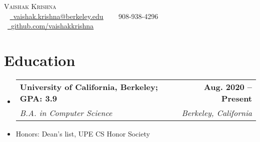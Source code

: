\documentclass[letterpaper,11pt]{article}
\makeatletter
\newcommand{\resumeSubheading}[4]{
  \vspace{-2pt}\item
    \begin{tabular*}{1.0\textwidth}[t]{l@{\extracolsep{\fill}}r}
      \vspace{2pt}
      \textbf{#1} & \textbf{\small #2} \\ 
      \textit{\small#3} & \textit{\small #4} \\
    \end{tabular*}\vspace{-5pt}
}
\newcommand{\resumeSubHeadingListStart}{\begin{itemize}[leftmargin=0.0in, label={}]}
\newcommand{\resumeSubHeadingListEnd}{\end{itemize}}
\makeatother
\begin{document}

\begin{center}
    {\Huge \scshape Vaishak Krishna} \\ \vspace{6pt}
    ~ \small \href{mailto:vaishak.krishna@berkeley.edu}{\raisebox{-0.2\height}\faEnvelope\  \underline{vaishak.krishna@berkeley.edu}} ~
    ~\small \raisebox{-0.1\height}\faPhone\ 908-938-4296 ~
    ~\href{https://github.com/vaishakkrishna}{\raisebox{-0.2\height}\faGithub\ \underline{github.com/vaishakkrishna}}~
    \vspace{-8pt}
\end{center}


\section{Education}
  \resumeSubHeadingListStart
    \resumeSubheading
  {University of California, Berkeley; GPA: 3.9}{Aug. 2020 -- Present}
      {B.A. in Computer Science}{Berkeley, California}
    \vspace{-5pt}
      \item{Honors: Dean's list, UPE CS Honor Society}
      \vspace{-5pt}
  \resumeSubHeadingListEnd
  
\end{document}

